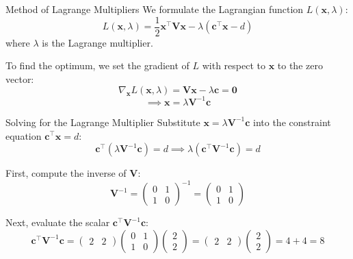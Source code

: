 \documentclass{beamer}
\begin{document}
\begin{frame}{Method of Lagrange Multipliers}
    We formulate the Lagrangian function $L(\mathbf{x}, \lambda)$:
    \begin{equation}
        L(\mathbf{x}, \lambda) = \frac{1}{2} \mathbf{x}^\top \mathbf{V} \mathbf{x} - \lambda (\mathbf{c}^\top \mathbf{x} - d)
    \end{equation}
    where $\lambda$ is the Lagrange multiplier.
    
    \vspace{0.5cm}
    To find the optimum, we set the gradient of $L$ with respect to $\mathbf{x}$ to the zero vector:
    \begin{equation}
        \nabla_{\mathbf{x}} L(\mathbf{x}, \lambda) = \mathbf{V}\mathbf{x} - \lambda\mathbf{c} = \mathbf{0}
    \end{equation}
    \begin{equation}
        \implies \mathbf{x} = \lambda \mathbf{V}^{-1}\mathbf{c}
    \end{equation}
\end{frame}

\begin{frame}{Solving for the Lagrange Multiplier}
    Substitute $\mathbf{x} = \lambda \mathbf{V}^{-1}\mathbf{c}$ into the constraint equation $\mathbf{c}^\top \mathbf{x} = d$:
    \begin{equation}
        \mathbf{c}^\top (\lambda \mathbf{V}^{-1}\mathbf{c}) = d \implies \lambda (\mathbf{c}^\top \mathbf{V}^{-1}\mathbf{c}) = d
    \end{equation}
    
    First, compute the inverse of $\mathbf{V}$:
    \begin{equation}
        \mathbf{V}^{-1} = \begin{pmatrix} 0 & 1 \\ 1 & 0 \end{pmatrix}^{-1} = \begin{pmatrix} 0 & 1 \\ 1 & 0 \end{pmatrix}
    \end{equation}
    
    Next, evaluate the scalar $\mathbf{c}^\top \mathbf{V}^{-1}\mathbf{c}$:
    \begin{equation}
        \mathbf{c}^\top \mathbf{V}^{-1}\mathbf{c} = \begin{pmatrix} 2 & 2 \end{pmatrix} \begin{pmatrix} 0 & 1 \\ 1 & 0 \end{pmatrix} \begin{pmatrix} 2 \\ 2 \end{pmatrix} = \begin{pmatrix} 2 & 2 \end{pmatrix} \begin{pmatrix} 2 \\ 2 \end{pmatrix} = 4 + 4 = 8
    \end{equation}
\end{frame}
\end{document}
